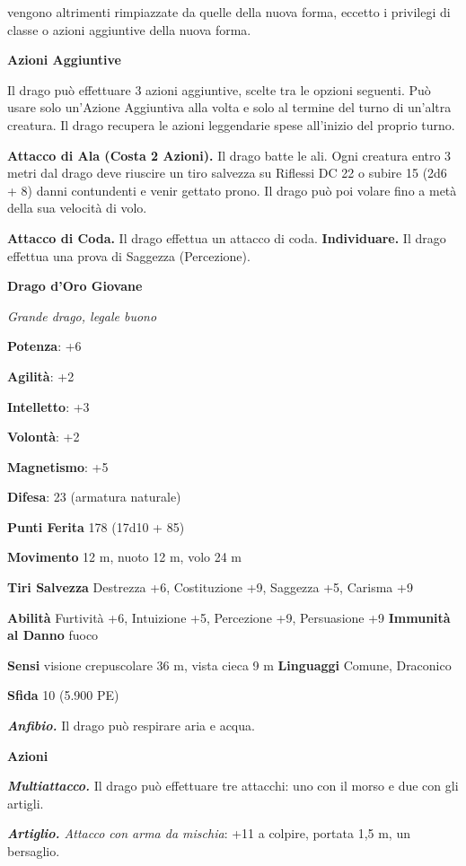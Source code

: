 \begin{multicols}{2}
vengono altrimenti rimpiazzate da quelle della nuova forma, eccetto i
privilegi di classe o azioni aggiuntive della nuova forma.

\textbf{Azioni Aggiuntive}

Il drago può effettuare 3 azioni aggiuntive, scelte tra le opzioni
seguenti. Può usare solo un'Azione Aggiuntiva alla volta e solo al
termine del turno di un'altra creatura. Il drago recupera le azioni
leggendarie spese all'inizio del proprio turno.

\textbf{Attacco di Ala (Costa 2 Azioni).} Il drago batte le ali. Ogni
creatura entro 3 metri dal drago deve riuscire un tiro salvezza su Riflessi DC 22 o subire 15 (2d6 + 8) danni contundenti e venir gettato
prono. Il drago può poi volare fino a metà della sua velocità di volo.

\textbf{Attacco di Coda.} Il drago effettua un attacco di coda.
\textbf{Individuare.} Il drago effettua una prova di Saggezza
(Percezione).

\textbf{Drago d'Oro Giovane}

\emph{Grande drago, legale buono}

\textbf{Potenza}: +6

\textbf{Agilità}: +2

\textbf{Intelletto}: +3

\textbf{Volontà}: +2

\textbf{Magnetismo}: +5

\textbf{Difesa}: 23 (armatura naturale)

\textbf{Punti Ferita} 178 (17d10 + 85)

\textbf{Movimento} 12 m, nuoto 12 m, volo 24 m

\textbf{Tiri Salvezza} Destrezza +6, Costituzione +9, Saggezza +5,
Carisma +9

\textbf{Abilità} Furtività +6, Intuizione +5, Percezione +9, Persuasione
+9 \textbf{Immunità al Danno} fuoco

\textbf{Sensi} visione crepuscolare 36 m, vista cieca 9 m
\textbf{Linguaggi} Comune, Draconico

\textbf{Sfida} 10 (5.900 PE)

\emph{\textbf{Anfibio.}} Il drago può respirare aria e acqua.

\textbf{Azioni}

\emph{\textbf{Multiattacco.}} Il drago può effettuare tre attacchi: uno
con il morso e due con gli artigli.

\emph{\textbf{Artiglio.} Attacco con arma da mischia}: +11 a colpire,
portata 1,5 m, un bersaglio.


\end{multicols}
